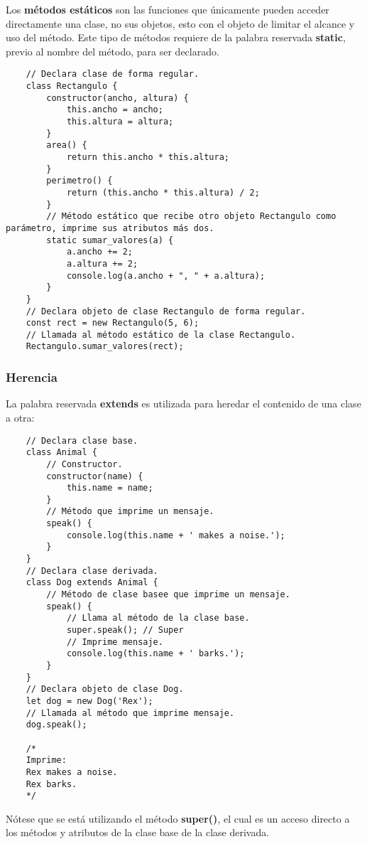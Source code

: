 Los \textbf{métodos estáticos} son las funciones que únicamente pueden acceder directamente una clase, no sus objetos, esto con el objeto de limitar el alcance y uso del método. Este tipo de métodos requiere de la palabra reservada \textbf{static}, previo al nombre del método, para ser declarado.
\begin{lstlisting}
    // Declara clase de forma regular.
    class Rectangulo {
        constructor(ancho, altura) {
            this.ancho = ancho;
            this.altura = altura;
        }
        area() {
            return this.ancho * this.altura;
        }
        perimetro() {
            return (this.ancho * this.altura) / 2;
        }
        // Método estático que recibe otro objeto Rectangulo como parámetro, imprime sus atributos más dos.
        static sumar_valores(a) {
            a.ancho += 2;
            a.altura += 2;
            console.log(a.ancho + ", " + a.altura);
        }
    }
    // Declara objeto de clase Rectangulo de forma regular.
    const rect = new Rectangulo(5, 6);
    // Llamada al método estático de la clase Rectangulo.
    Rectangulo.sumar_valores(rect);
\end{lstlisting}


\subsubsection{Herencia}

La palabra reservada \textbf{extends} es utilizada para heredar el contenido de una clase a otra:
\begin{lstlisting}
    // Declara clase base.
    class Animal {
        // Constructor.
        constructor(name) {
            this.name = name;
        }
        // Método que imprime un mensaje.
        speak() {
            console.log(this.name + ' makes a noise.');
        }
    }
    // Declara clase derivada.
    class Dog extends Animal {
        // Método de clase basee que imprime un mensaje.
        speak() {
            // Llama al método de la clase base.
            super.speak(); // Super
            // Imprime mensaje.
            console.log(this.name + ' barks.');
        }
    }
    // Declara objeto de clase Dog.
    let dog = new Dog('Rex');
    // Llamada al método que imprime mensaje.
    dog.speak();

    /*
    Imprime:
    Rex makes a noise.
    Rex barks.
    */
\end{lstlisting}

Nótese que se está utilizando el método \textbf{super()}, el cual es un acceso directo a los métodos y atributos de la clase base de la clase derivada.


